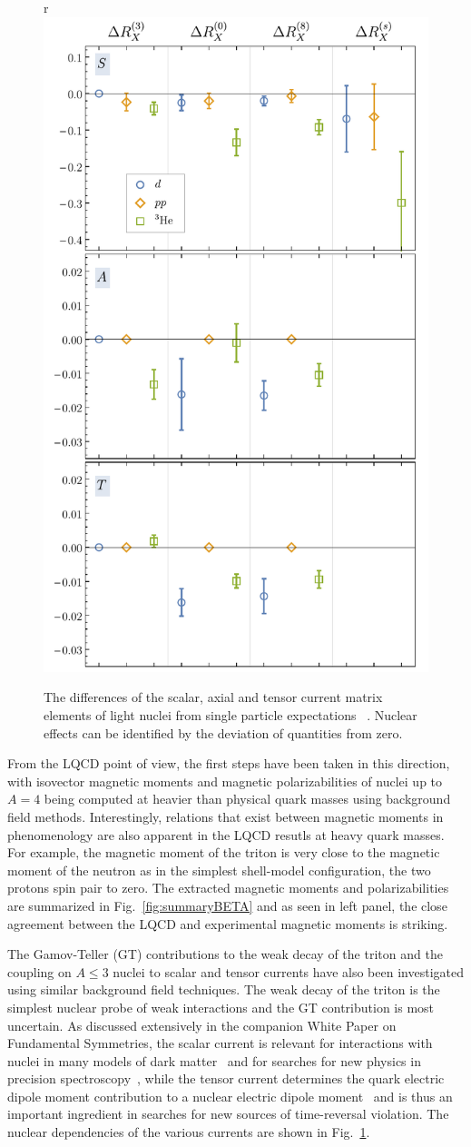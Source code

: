 %
\begin{figure}{r}
	\vspace*{-0cm}
	\centering
	\includegraphics[width=0.4\columnwidth]{figures/RatioSummary.pdf}  
	\caption{ 
		The differences of the scalar, axial and tensor current matrix elements of light nuclei from single particle expectations ~\protect\cite{Beane:2015yha}. Nuclear effects can be identified by the deviation of quantities from zero.   
	}
	\label{fig:SAT}
	\vspace*{-0.5cm}
\end{figure}
%
From the LQCD point of view,  the first steps have been taken in this direction, with isovector magnetic moments \cite{Beane:2014ora,Beane:2015yha,Detmold:2015daa} and magnetic  polarizabilities \cite{Chang:2015qxa} of nuclei up to $A=4$ being computed at heavier than physical quark masses using background field methods. Interestingly, relations that exist between magnetic moments in phenomenology are also apparent in the LQCD resutls at heavy quark masses. For example,  the magnetic moment of the triton is very close to the magnetic moment of the neutron as in the simplest shell-model configuration, the two protons spin pair to zero. The extracted magnetic moments and polarizabilities are summarized in Fig.~\ref{fig:summaryBETA} and as seen in left panel, the close agreement between the LQCD  and experimental magnetic moments is striking.

The Gamov-Teller (GT) contributions to the weak decay of the triton \cite{Savage:2016kon} and the coupling on $A\le3$ nuclei to scalar and tensor currents \cite{Chang:2017eiq} have also been investigated using similar background field techniques. The weak decay of the triton is the simplest nuclear probe of weak interactions and the GT contribution is most uncertain. 
As discussed extensively in the companion White Paper on Fundamental Symmetries, the scalar current is relevant for interactions with nuclei in many models of dark matter~\cite{Undagoitia:2015gya} and for searches for new physics in precision spectroscopy~\cite{Delaunay:2016brc,Delaunay:2017dku}, while the tensor current determines 
the quark electric dipole moment contribution to a nuclear electric dipole moment~\cite{Engel:2013lsa,Yamanaka:2016umw,Chupp:2017rkp} and is thus an important ingredient in searches for new sources of time-reversal violation. 
 The nuclear dependencies of the various currents are shown in Fig.~\ref{fig:SAT}.


